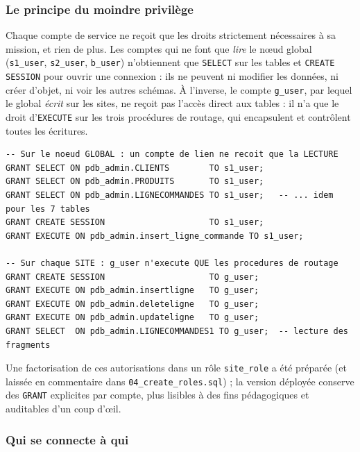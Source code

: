 \documentclass[11pt,a4paper]{article}
\begin{document}
\subsubsection*{Le principe du moindre privilège}

Chaque compte de service ne reçoit que les droits strictement nécessaires à sa
mission, et rien de plus. Les comptes qui ne font que \emph{lire} le nœud
global (\texttt{s1\_user}, \texttt{s2\_user}, \texttt{b\_user}) n'obtiennent que
\texttt{SELECT} sur les tables et \texttt{CREATE SESSION} pour ouvrir une
connexion : ils ne peuvent ni modifier les données, ni créer d'objet, ni voir
les autres schémas. À l'inverse, le compte \texttt{g\_user}, par lequel le
global \emph{écrit} sur les sites, ne reçoit pas l'accès direct aux tables : il
n'a que le droit d'\texttt{EXECUTE} sur les trois procédures de routage, qui
encapsulent et contrôlent toutes les écritures.

\begin{lstlisting}[style=sql,caption={Habilitations au plus juste : aucun \texttt{GRANT ALL} (extraits de \texttt{04\_create\_roles.sql} et des scripts de site).},label={lst:grants}]
-- Sur le noeud GLOBAL : un compte de lien ne recoit que la LECTURE
GRANT SELECT ON pdb_admin.CLIENTS        TO s1_user;
GRANT SELECT ON pdb_admin.PRODUITS       TO s1_user;
GRANT SELECT ON pdb_admin.LIGNECOMMANDES TO s1_user;   -- ... idem pour les 7 tables
GRANT CREATE SESSION                     TO s1_user;
GRANT EXECUTE ON pdb_admin.insert_ligne_commande TO s1_user;

-- Sur chaque SITE : g_user n'execute QUE les procedures de routage
GRANT CREATE SESSION                     TO g_user;
GRANT EXECUTE ON pdb_admin.insertligne   TO g_user;
GRANT EXECUTE ON pdb_admin.deleteligne   TO g_user;
GRANT EXECUTE ON pdb_admin.updateligne   TO g_user;
GRANT SELECT  ON pdb_admin.LIGNECOMMANDES1 TO g_user;  -- lecture des fragments
\end{lstlisting}

Une factorisation de ces autorisations dans un rôle \texttt{site\_role} a été
préparée (et laissée en commentaire dans \texttt{04\_create\_roles.sql}) ; la
version déployée conserve des \texttt{GRANT} explicites par compte, plus
lisibles à des fins pédagogiques et auditables d'un coup d'œil.

\subsubsection*{Qui se connecte à qui}
\end{document}
